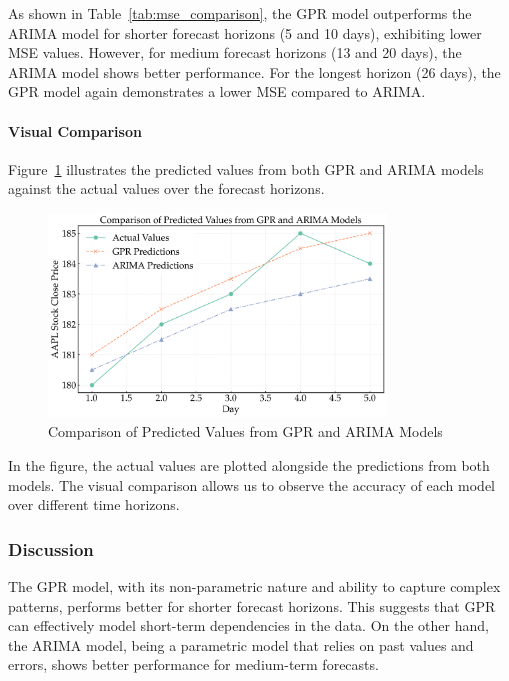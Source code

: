 As shown in Table~\ref{tab:mse_comparison}, the GPR model outperforms the ARIMA model for shorter forecast horizons (5 and 10 days), exhibiting lower MSE values. However, for medium forecast horizons (13 and 20 days), the ARIMA model shows better performance. For the longest horizon (26 days), the GPR model again demonstrates a lower MSE compared to ARIMA.

\paragraph{Visual Comparison}

Figure~\ref{fig:prediction_comparison} illustrates the predicted values from both GPR and ARIMA models against the actual values over the forecast horizons.

\begin{figure}[h!]
\centering
\includegraphics[width=0.8\textwidth]{figures/prediction_comparison.png}
\caption{Comparison of Predicted Values from GPR and ARIMA Models}
\label{fig:prediction_comparison}
\end{figure}

\noindent In the figure, the actual values are plotted alongside the predictions from both models. The visual comparison allows us to observe the accuracy of each model over different time horizons.

\subsubsection{Discussion}

The GPR model, with its non-parametric nature and ability to capture complex patterns, performs better for shorter forecast horizons. This suggests that GPR can effectively model short-term dependencies in the data. On the other hand, the ARIMA model, being a parametric model that relies on past values and errors, shows better performance for medium-term forecasts.

